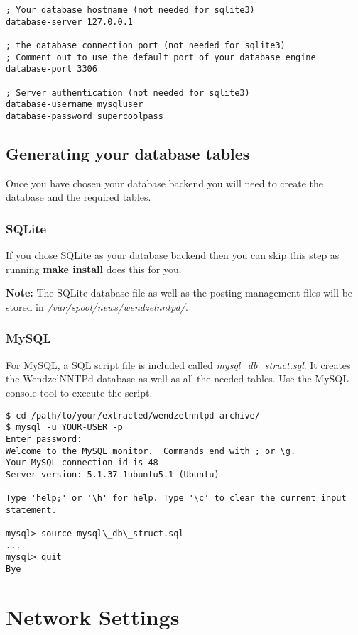 \begin{verbatim}
; Your database hostname (not needed for sqlite3)
database-server 127.0.0.1

; the database connection port (not needed for sqlite3)
; Comment out to use the default port of your database engine
database-port 3306

; Server authentication (not needed for sqlite3)
database-username mysqluser
database-password supercoolpass
\end{verbatim}

\subsection{Generating your database tables}

Once you have chosen your database backend you will need to create the database and the required tables.

\subsubsection{SQLite}

If you chose SQLite as your database backend then you can skip this step as running {\bf make install} does this for you.

{\bf Note:} The SQLite database file as well as the posting management files will be stored in {\it /var/spool/news/wendzelnntpd/}.

\subsubsection{MySQL}

For MySQL, a SQL script file is included called {\it mysql\_db\_struct.sql}. It creates the WendzelNNTPd database as well as all the needed tables. Use the MySQL console tool to execute the script.

\begin{verbatim}
$ cd /path/to/your/extracted/wendzelnntpd-archive/
$ mysql -u YOUR-USER -p
Enter password:
Welcome to the MySQL monitor.  Commands end with ; or \g.
Your MySQL connection id is 48
Server version: 5.1.37-1ubuntu5.1 (Ubuntu)

Type 'help;' or '\h' for help. Type '\c' to clear the current input statement.

mysql> source mysql\_db\_struct.sql
...
mysql> quit
Bye
\end{verbatim}

\section{Network Settings}

